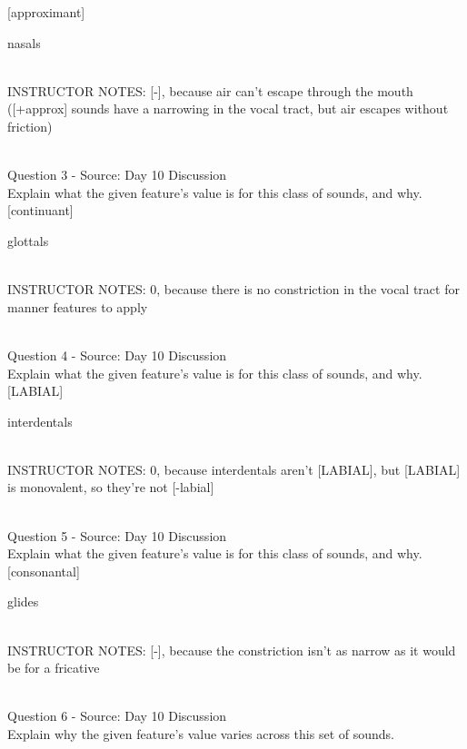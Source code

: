 \documentclass[12pt]{article}
\begin{document}
{[approximant]}

nasals


~\\
INSTRUCTOR NOTES: [-], because air can't escape through the mouth ([+approx] sounds have a narrowing in the vocal tract, but air escapes without friction)


~\\

{\large Question 3} - Source: Day 10 Discussion\\

Explain what the given feature’s value is for this class of sounds, and why.\\

{[continuant]}

glottals


~\\
INSTRUCTOR NOTES: 0, because there is no constriction in the vocal tract for manner features to apply


~\\

{\large Question 4} - Source: Day 10 Discussion\\

Explain what the given feature’s value is for this class of sounds, and why.\\

{[LABIAL]}

interdentals


~\\
INSTRUCTOR NOTES: 0, because interdentals aren't [LABIAL], but [LABIAL] is monovalent, so they're not [-labial]


~\\

{\large Question 5} - Source: Day 10 Discussion\\

Explain what the given feature’s value is for this class of sounds, and why.\\

{[consonantal]}

glides


~\\
INSTRUCTOR NOTES: [-], because the constriction isn't as narrow as it would be for a fricative


~\\

{\large Question 6} - Source: Day 10 Discussion\\

Explain why the given feature's value varies across this set of sounds.\\
\end{document}
